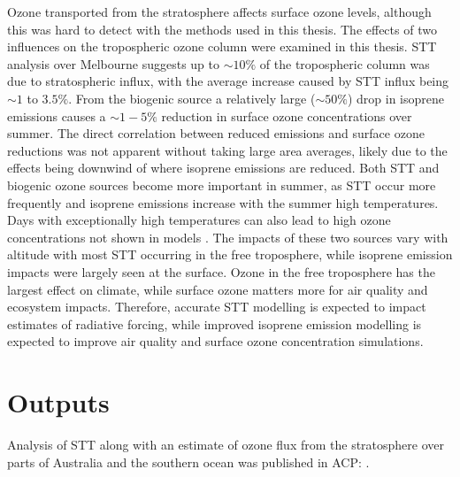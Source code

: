   Ozone transported from the stratosphere affects surface ozone levels, although this was hard to detect with the methods used in this thesis.
  The effects of two influences on the tropospheric ozone column were examined in this thesis.
  STT analysis over Melbourne suggests up to $\sim 10\%$ of the tropospheric column was due to stratospheric influx, with the average increase caused by STT influx being $\sim 1$ to $3.5\%$.
  From the biogenic source a relatively large ($\sim{50}\%$) drop in isoprene emissions causes a $\sim{1-5}\%$ reduction in surface ozone concentrations over summer.
  The direct correlation between reduced emissions and surface ozone reductions was not apparent without taking large area averages, likely due to the effects being downwind of where isoprene emissions are reduced.
  Both STT and biogenic ozone sources become more important in summer, as STT occur more frequently and isoprene emissions increase with the summer high temperatures.
  Days with exceptionally high temperatures can also lead to high ozone concentrations not shown in models \parencite[e.g.,][]{PatonWalsh2018}.
  The impacts of these two sources vary with altitude with most STT occurring in the free troposphere, while isoprene emission impacts were largely seen at the surface.
  Ozone in the free troposphere has the largest effect on climate, while surface ozone matters more for air quality and ecosystem impacts.
  Therefore, accurate STT modelling is expected to impact estimates of radiative forcing, while improved isoprene emission modelling is expected to improve air quality and surface ozone concentration simulations.
  

  
  
\section{Outputs}
  \label{Conclusions:outputs}
  
  Analysis of STT along with an estimate of ozone flux from the stratosphere over parts of Australia and the southern ocean was published in ACP: .
  
